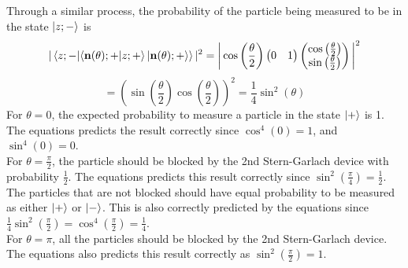 \begin{sol}
\begin{enumerate}[label=\textbf{(\alph*)}]
\begin{equation}
\end{equation}
    Through a similar process, the probability of the particle being measured to be in the state $\ket{z;-}$ is
    \begin{equation}
	|\braket{z;-}{\braket{\mathbf{n}(\theta);+}{z;+}\ket{\mathbf{n}(\theta);+}}|^2=\bigg|\cos\left(\frac{\theta}{2}\right)\begin{pmatrix}0&1\end{pmatrix}\begin{pmatrix}\cos\left(\frac{\theta}{2}\right)\\\sin\left(\frac{\theta}{2}\right)\end{pmatrix}\bigg|^2
\end{equation}
    \begin{equation}
	=\left(\sin\left(\frac{\theta}{2}\right)\cos\left(\frac{\theta}{2}\right)\right)^2=\frac{1}{4}\sin^2(\theta)
\end{equation}
    For $\theta=0$, the expected probability to measure a particle in the state $\ket +$ is 1. The equations predicts the result correctly since $\cos^4(0)=1$, and $\sin^4(0)=0$.\\
    For $\theta=\frac{\pi}{2}$, the particle should be blocked by the 2nd Stern-Garlach device with probability $\frac{1}{2}$. The equations predicts this result correctly since $\sin^2(\frac{\pi}{4})=\frac{1}{2}$. The particles that are not blocked should have equal probability to be measured as either $\ket+$ or $\ket-$. This is also correctly predicted by the equations since $\frac{1}{4}\sin^2(\frac{\pi}{2})=\cos^4(\frac{\pi}{2})=\frac{1}{4}$.\\
    For $\theta=\pi$, all the particles should be blocked by the 2nd Stern-Garlach device. The equations also predicts this result correctly as $\sin^2(\frac{\pi}{2})=1$.
    \end{enumerate}
    \end{sol}